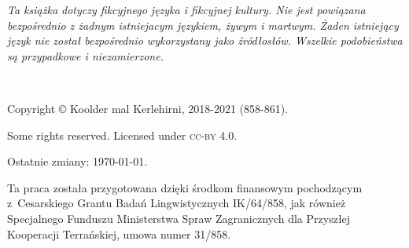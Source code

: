 \emph{Ta książka dotyczy fikcyjnego języka i fikcyjnej kultury. Nie jest
powiązana bezpośrednio z żadnym istniejacym językiem, żywym i martwym. Żaden
istniejący język nie został bezpośrednio wykorzystany jako źródłosłów. Wszelkie
podobieństwa są przypadkowe i niezamierzone.}

~\vfill

\begingroup
\setlength\parindent{0pt}\footnotesize
Copyright © Koolder mal Kerlehirni, 2018-2021 (858-861).

\bigskip

Some rights reserved. Licensed under \textsc{cc-by} 4.0.

Ostatnie zmiany: \today{}.

\medskip

Ta praca została przygotowana dzięki środkom finansowym
pochodzącym z~Cesarskiego Grantu Badań Lingwistycznych IK/64/858,
jak również Specjalnego Funduszu Ministerstwa Spraw Zagranicznych dla
Przyszłej Kooperacji Terrańskiej, umowa numer 31/858.

\endgroup